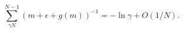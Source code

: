 \begin{equation}
\label{Eq_A36}
\sum^{N-1}_{\gamma N} (m + \epsilon + g(m))^{-1} = - \ln \gamma + O(1/N).
\end{equation}


